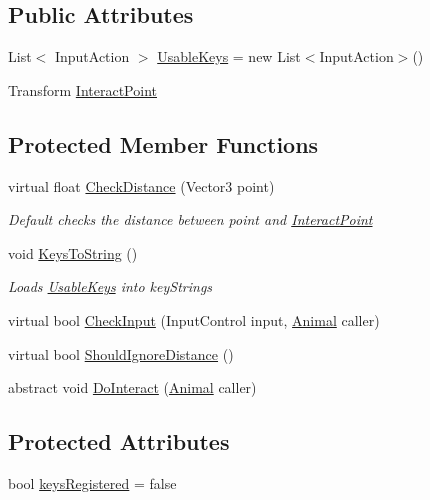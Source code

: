 \subsection*{Public Attributes}
\begin{DoxyCompactItemize}
\item 
List$<$ Input\+Action $>$ \mbox{\hyperlink{class_mono_interacter_a29fdba9686647d0a6c83244a8c17973a}{Usable\+Keys}} = new List$<$Input\+Action$>$()
\item 
Transform \mbox{\hyperlink{class_mono_interacter_a311fa1a8d88a508851977760b6db955e}{Interact\+Point}}
\end{DoxyCompactItemize}
\subsection*{Protected Member Functions}
\begin{DoxyCompactItemize}
\item 
virtual float \mbox{\hyperlink{class_mono_interacter_a3d36c682922d670329f90e5573e67c45}{Check\+Distance}} (Vector3 point)
\begin{DoxyCompactList}\small\item\em Default checks the distance between {\itshape point}  and \mbox{\hyperlink{class_mono_interacter_a311fa1a8d88a508851977760b6db955e}{Interact\+Point}} \end{DoxyCompactList}\item 
void \mbox{\hyperlink{class_mono_interacter_a704a1522a1fad421361e62c04161132f}{Keys\+To\+String}} ()
\begin{DoxyCompactList}\small\item\em Loads \mbox{\hyperlink{class_mono_interacter_a29fdba9686647d0a6c83244a8c17973a}{Usable\+Keys}} into key\+Strings \end{DoxyCompactList}\item 
virtual bool \mbox{\hyperlink{class_mono_interacter_ae24d7fd0cab970a144df6fded900fb01}{Check\+Input}} (Input\+Control input, \mbox{\hyperlink{class_animal}{Animal}} caller)
\item 
virtual bool \mbox{\hyperlink{class_mono_interacter_af09c79465a1a2a721c8a841405e608fa}{Should\+Ignore\+Distance}} ()
\item 
abstract void \mbox{\hyperlink{class_mono_interacter_a707ff1aa57e76942005e27243ad1f296}{Do\+Interact}} (\mbox{\hyperlink{class_animal}{Animal}} caller)
\end{DoxyCompactItemize}
\subsection*{Protected Attributes}
\begin{DoxyCompactItemize}
\item 
bool \mbox{\hyperlink{class_mono_interacter_afe9a65dfabee6f8d8e1fa56eb503fa38}{keys\+Registered}} = false
\end{DoxyCompactItemize}


